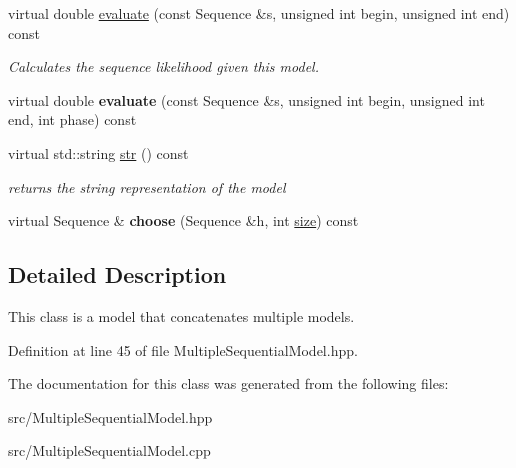 \begin{DoxyCompactItemize}
\mbox{\label{classtops_1_1MultipleSequentialModel_a0758464ada45b626b922e320a1be91a4}} 
virtual double \hyperlink{classtops_1_1MultipleSequentialModel_a0758464ada45b626b922e320a1be91a4}{evaluate} (const Sequence \&s, unsigned int begin, unsigned int end) const
\begin{DoxyCompactList}\small\item\em Calculates the sequence likelihood given this model. \end{DoxyCompactList}\item 
\mbox{\label{classtops_1_1MultipleSequentialModel_acd9e80851854e709a22d943629a7fd48}} 
virtual double {\bfseries evaluate} (const Sequence \&s, unsigned int begin, unsigned int end, int phase) const
\item 
\mbox{\label{classtops_1_1MultipleSequentialModel_aa4e45bfb8a970eeb4fca2b4868586b75}} 
virtual std\+::string \hyperlink{classtops_1_1MultipleSequentialModel_aa4e45bfb8a970eeb4fca2b4868586b75}{str} () const
\begin{DoxyCompactList}\small\item\em returns the string representation of the model \end{DoxyCompactList}\item 
\mbox{\label{classtops_1_1MultipleSequentialModel_aabb34c6f29a9140c8db99fa323fd001c}} 
virtual Sequence \& {\bfseries choose} (Sequence \&h, int \hyperlink{classtops_1_1ProbabilisticModel_a4e3910e9b9b848b7078e7101909ae82a}{size}) const
\end{DoxyCompactItemize}


\subsection{Detailed Description}
This class is a model that concatenates multiple models. 

Definition at line 45 of file Multiple\+Sequential\+Model.\+hpp.



The documentation for this class was generated from the following files\+:\begin{DoxyCompactItemize}
\item 
src/Multiple\+Sequential\+Model.\+hpp\item 
src/Multiple\+Sequential\+Model.\+cpp\end{DoxyCompactItemize}
